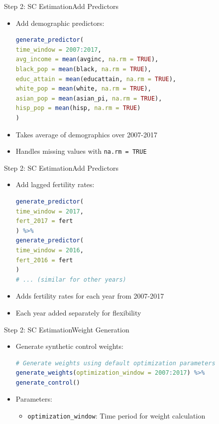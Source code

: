 \documentclass[hyperref={pdfpagelabels=false}]{beamer}
\begin{document}
\begin{frame}[fragile]{Step 2: SC Estimation}{Add Predictors}
\begin{itemize}
\item Add demographic predictors:
\vspace{0.2cm}
\begin{lstlisting}[language=R, style=r-style]
generate_predictor(
time_window = 2007:2017,
avg_income = mean(avginc, na.rm = TRUE),
black_pop = mean(black, na.rm = TRUE),
educ_attain = mean(educattain, na.rm = TRUE),
white_pop = mean(white, na.rm = TRUE),
asian_pop = mean(asian_pi, na.rm = TRUE),
hisp_pop = mean(hisp, na.rm = TRUE)
)
\end{lstlisting}
\item Takes average of demographics over 2007-2017
\item Handles missing values with \texttt{na.rm = TRUE}
\end{itemize}
\end{frame}

\begin{frame}[fragile]{Step 2: SC Estimation}{Add Predictors}
\begin{itemize}
\item Add lagged fertility rates:
\vspace{0.2cm}
\begin{lstlisting}[language=R, style=r-style]
generate_predictor(
time_window = 2017,
fert_2017 = fert
) %>%
generate_predictor(
time_window = 2016,
fert_2016 = fert
)
# ... (similar for other years)
\end{lstlisting}
\item Adds fertility rates for each year from 2007-2017
\item Each year added separately for flexibility
\end{itemize}
\end{frame}

\begin{frame}[fragile]{Step 2: SC Estimation}{Weight Generation}
\begin{itemize}
\item Generate synthetic control weights:
\vspace{0.2cm}
\begin{lstlisting}[language=R, style=r-style]
 # Generate weights using default optimization parameters
generate_weights(optimization_window = 2007:2017) %>%
generate_control()
\end{lstlisting}
\item Parameters:
\begin{itemize}
\item \texttt{optimization\_window}: Time period for weight calculation
\end{itemize}
\end{itemize}
\end{frame}
\end{document}
